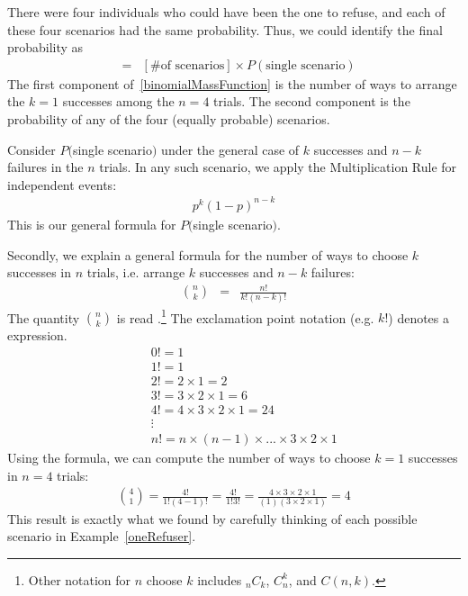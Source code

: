 There were four individuals who could have been the one to refuse, and each of these four scenarios had the same probability. Thus, we could identify the final probability as
\begin{eqnarray}
[\text{final probability}] &=&  [\text{\# of scenarios}] \times P(\text{single scenario})
\label{genBinomialFormula}
\end{eqnarray}
The first component of~\ref{binomialMassFunction}
is the number of ways to arrange the $k=1$ successes among the $n=4$ trials. 
The second component is the probability of any of the four (equally probable) scenarios.

Consider $P($single scenario$)$ under the general case of $k$ successes and $n-k$ failures in the $n$ trials. In any such scenario, we apply the Multiplication Rule for independent events:
\begin{eqnarray}
p^k(1-p)^{n-k}
\end{eqnarray}
This is our general formula for $P($single scenario$)$.


Secondly, we %
explain
a general formula for the number of ways to choose $k$ successes in $n$ trials, i.e. arrange $k$ successes and $n-k$ failures:
\begin{eqnarray}
{n\choose k} &=& \displaystyle\frac{n!}{k!(n-k)!}
\end{eqnarray}
The quantity ${n\choose k}$ is read .\footnote{Other notation for $n$ choose $k$ includes $_nC_k$, $C_n^k$, and $C(n,k)$.} The exclamation point notation (e.g. $k!$) denotes a \label{factorialDefinitionInTheBinomialSection} expression.
\begin{eqnarray*}
&& 0! = 1 \label{zeroFactorial} \\
&& 1! = 1 \\
&& 2! = 2\times1 = 2 \\
&& 3! = 3\times2\times1 = 6 \\
&& 4! = 4\times3\times2\times1 = 24 \\
&& \vdots \\
&& n! = n\times(n-1)\times...\times3\times2\times1
\end{eqnarray*}
Using the formula, we can compute the number of ways to choose $k=1$ successes in $n=4$ trials:
\begin{eqnarray*}
{4 \choose 1} = \frac{4!}{1!(4-1)!} =  \frac{4!}{1!3!} 
	= \frac{4\times3\times2\times1}{(1)(3\times2\times1)} = 4
\end{eqnarray*}
This result is exactly what we found by carefully thinking of each possible scenario in Example~\ref{oneRefuser}.

